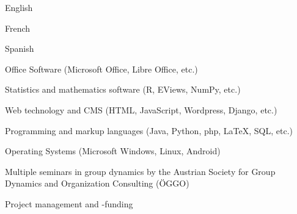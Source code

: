 


{\begin{cvenumerate}
		\item English 
		\item French 
		\item Spanish 
	\end{cvenumerate}}

%

	{\begin{cvenumerate}
		\item Office Software (Microsoft Office, Libre Office, etc.) 
		\item Statistics and mathematics software (R, EViews, NumPy, etc.) 
		\item Web technology and CMS (HTML, JavaScript, Wordpress, Django, etc.) 
		\item Programming and markup languages (Java, Python, php, LaTeX, SQL, etc.) 
		\item Operating Systems (Microsoft Windows, Linux, Android) 
	\end{cvenumerate}}

	{\begin{cvenumerate}
		\item Multiple seminars in group dynamics by the Austrian Society for Group Dynamics and Organization Consulting (ÖGGO)
		\item Project management and -funding
	\end{cvenumerate}}

